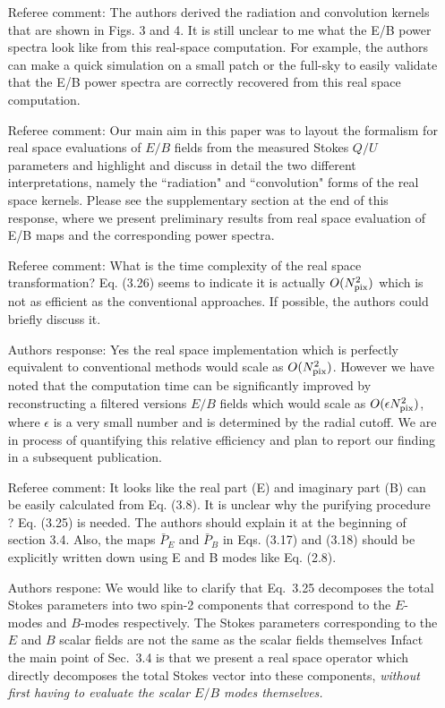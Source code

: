 \documentclass[12pt]{article}
\begin{document}
\begin{itemize}
\item[{Referee comment: }] The authors derived the radiation and convolution kernels that are shown in Figs. 3 and 4. It is still unclear to me what the E/B power spectra look like from this real-space computation. For example, the authors can make a quick simulation on a small patch or the full-sky to easily validate that the E/B power spectra are correctly recovered from this real space computation.

\item[{Referee comment: }]  Our main aim in this paper was to layout the formalism for real space evaluations of $E/B$ fields from the measured Stokes $Q/U$ parameters and highlight and discuss in detail the two different interpretations, namely the ``radiation" and ``convolution" forms of the real space kernels. Please see the supplementary section at the end of this response, where we present preliminary results from real space evaluation of E/B maps and the corresponding power spectra.\\

\item[{Referee comment:}] What is the time complexity of the real space transformation? Eq. (3.26) seems to indicate it is actually $O(N_{\rm pix}^2 )$ which is not as efficient as the conventional approaches. If possible, the authors could briefly discuss it.

\item[{Authors response:}] Yes the real space implementation which is perfectly equivalent to conventional methods would scale as $O(N_{\rm pix}^2 )$. However we have noted that the computation time can be significantly improved by reconstructing a filtered versions $E/B$ fields which would scale as $O(\epsilon N_{\rm pix}^2 )$, where $\epsilon$ is a very small number and is determined by the radial cutoff. We are in process of quantifying this relative efficiency and plan to report our finding in a subsequent publication.

\item[{Referee comment: }]It looks like the real part (E) and imaginary part (B) can be easily calculated from Eq. (3.8). It is unclear why the purifying procedure ? Eq. (3.25) is needed. The authors should explain it at the beginning of section 3.4. Also, the maps $\bar P_E$ and $\bar P_B$ in Eqs. (3.17) and (3.18) should be explicitly written down using E and B modes like Eq. (2.8).

\item[{Authors respone: }] We would like to clarify that Eq.~3.25 decomposes the total Stokes parameters into two spin-2 components that correspond to the $E$-modes and $B$-modes respectively. The Stokes parameters corresponding to the $E$ and $B$ scalar fields are not the same as the scalar fields themselves  Infact the main point of Sec.~3.4 is that we present a real space operator which directly decomposes the total Stokes vector into these components, \emph{without first having to evaluate the scalar $E/B$ modes themselves.} 


\end{itemize}
\end{document}
